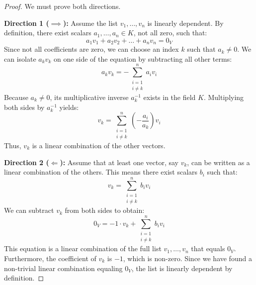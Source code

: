 \begin{proof}
We must prove both directions.

\textbf{Direction 1 ($\implies$):} 
Assume the list $v_1, \dots, v_n$ is linearly dependent. By definition, there exist scalars $a_1, \dots, a_n \in K$, not all zero, such that:
\[
a_1 v_1 + a_2 v_2 + \dots + a_n v_n = 0_V
\]
Since not all coefficients are zero, we can choose an index $k$ such that $a_k \ne 0$. We can isolate $a_k v_k$ on one side of the equation by subtracting all other terms:
\[
a_k v_k = - \sum_{\substack{i=1 \\ i \ne k}}^n a_i v_i
\]
Because $a_k \ne 0$, its multiplicative inverse $a_k^{-1}$ exists in the field $K$. Multiplying both sides by $a_k^{-1}$ yields:
\[
v_k = \sum_{\substack{i=1 \\ i \ne k}}^n \left( -\frac{a_i}{a_k} \right) v_i
\]
Thus, $v_k$ is a linear combination of the other vectors.

\textbf{Direction 2 ($\Longleftarrow$):} 
Assume that at least one vector, say $v_k$, can be written as a linear combination of the others. This means there exist scalars $b_i$ such that:
\[
v_k = \sum_{\substack{i=1 \\ i \ne k}}^n b_i v_i
\]
We can subtract $v_k$ from both sides to obtain:
\[
0_V = -1 \cdot v_k + \sum_{\substack{i=1 \\ i \ne k}}^n b_i v_i
\]
This equation is a linear combination of the full list $v_1, \dots, v_n$ that equals $0_V$. Furthermore, the coefficient of $v_k$ is $-1$, which is non-zero. Since we have found a non-trivial linear combination equaling $0_V$, the list is linearly dependent by definition.
\end{proof}


